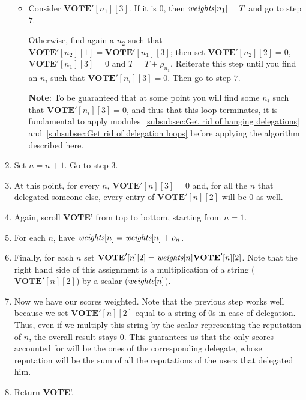 \documentclass[submission, copyright,creativecommons,sharealike,noncommercial]{eptcs}
\newcommand{\Vote}{\textbf{VOTE}\xspace}
\begin{document}
\begin{enumerate}
\begin{itemize}
			\item Consider $\Vote'[n_1][3]$. If it is $0$, then $\emph{weights}[n_1] = T$ and go to step $7$. 
			
			Otherwise, find again a $n_2$ such that $\Vote'[n_2][1] = \Vote'[n_1][3]$; then set $\Vote'[n_2][2] = 0$, $\Vote'[n_1][3] = 0$ and $T = T + \rho_{n_1}$. Reiterate this step until 
			you find an $n_i$ such that $\Vote'[n_i][3]=0$. Then go to step $7$.
			
			\textbf{Note}: To be guaranteed that at some point you will find some $n_i$ such that $\Vote'[n_i][3]=0$, and thus that this loop terminates, it is fundamental to apply modules~\ref{subsubsec:Get rid of hanging delegations} and~\ref{subsubsec:Get rid of delegation loops} before applying the algorithm described here.
		\end{itemize}
	
		\item Set $n=n+1$. Go to step $3$.
	
		\item At this point, for every $n$, $\Vote'[n][3]=0$ and, for all the $n$ that delegated someone else, every entry of $\Vote'[n][2]$ will be $0$ as well.
	
		\item Again, scroll \Vote' from top to bottom, starting from $n=1$.
	
		\item For each $n$, have $\emph{weights}[n] = \emph{weights}[n] + \rho_n$.
	
		\item Finally, for each $n$ set $\Vote'[n][2] = \emph{weights}[n] \Vote'[n][2]$. Note that the right hand side of this assignment is a multiplication of a string ($\Vote'[n][2]$) by a scalar ($ \emph{weights}[n]$).
		
		\item Now we have our scores weighted. Note that the previous step works well because we set $\Vote'[n][2]$ equal to a string of $0$s in case of delegation. Thus, even if we multiply this string by the scalar representing the reputation of $n$, the overall result stays $0$. This guarantees us that the only scores accounted for will be the ones of the corresponding delegate, whose reputation will be the sum of all the reputations of the users that delegated him.
		
		\item Return \Vote'.
	\end{enumerate}
\end{document}
